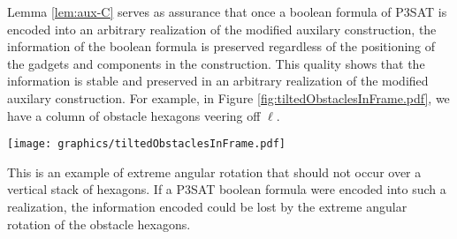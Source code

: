 \documentclass[10pt]{CSUNthesis}
\theoremstyle{plain}%
\theoremstyle{definition}
\theoremstyle{remark}
\begin{document}
Lemma \ref{lem:aux-C} serves as assurance that once a boolean formula of P3SAT is encoded into an arbitrary realization of the modified auxilary construction, the information of the boolean formula is preserved regardless of the positioning of the gadgets and components in the construction.
This quality shows that the information is stable and preserved in an arbitrary realization of the modified auxilary construction.
For example, in Figure \ref{fig:tiltedObstaclesInFrame.pdf}, we have a column of obstacle hexagons veering off $\ell$.

\begin{minipage}{\linewidth}
\begin{center}
\texttt{[image: graphics/tiltedObstaclesInFrame.pdf]}
\label{fig:tiltedObstaclesInFrame.pdf}
\end{center}
\end{minipage}

This is an example of extreme angular rotation that should not occur over a vertical stack of hexagons. 
If a P3SAT boolean formula were encoded into such a realization, the information encoded could be lost by the extreme angular rotation of the obstacle hexagons.
\end{document}
